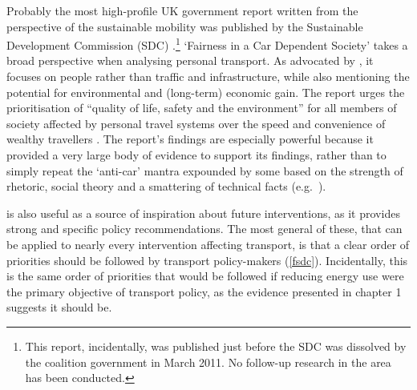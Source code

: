 Probably the most high-profile UK government report written from the perspective
of the sustainable mobility was published by the Sustainable Development
Commission (SDC) \citep{Kay2011}.\footnote{This report, incidentally, was
published just before the SDC was dissolved
by the coalition government in March 2011. No follow-up research
in the area has been conducted.
}
`Fairness in a Car
Dependent Society' takes
a broad perspective when analysing personal transport.
As advocated by \citet{Banister2008},
it focuses on people rather than traffic and infrastructure, while also mentioning
the potential for environmental and (long-term) economic gain.
The report urges the prioritisation of
``quality of life, safety and the environment'' for all members of society
affected by personal travel systems over the speed and convenience of
wealthy travellers \citep[p.~5]{Kay2011}. The report's findings are
especially powerful because it provided a very large body of evidence
to support its findings, rather than to simply repeat the `anti-car' mantra
expounded by some based on the strength of rhetoric, social theory and
a smattering of technical facts (e.g.~\citealp{Dennis2009}).
% 

\citet{Kay2011} is also useful as a source of inspiration about
future interventions, as it provides %
strong and specific policy recommendations. The most general of these, that 
can be applied to nearly every intervention affecting transport, is that a clear order
of priorities should be followed by transport policy-makers (\cref{fsdc}).
Incidentally, this is the same order of priorities that would be
followed if reducing energy use were the primary objective of
transport policy, as the evidence presented in chapter 1 suggests it should be.

